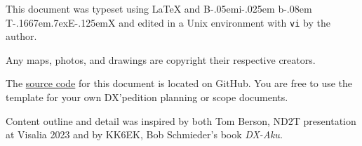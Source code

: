 \documentclass[11pt]{article}
\def\BibTeX{{\rm B\kern-.05em{\sc i\kern-.025em b}\kern-.08em
    T\kern-.1667em\lower.7ex\hbox{E}\kern-.125emX}}
\begin{document}
\par
\begin{colophon}
\begin{flushleft}
This document was typeset using {\LaTeX} and {\BibTeX} and edited
in a Unix environment with {\texttt{vi}} by the author.
\par
Any maps, photos, and drawings are copyright their respective
creators.
\par
The \href{https://github.com/radiojeff/vk9l}{source code} for this
document is located on GitHub.  You are free to use the template
for your own DX'pedition planning or scope documents.
\par
Content outline and detail was inspired by both Tom Berson, ND2T
presentation at Visalia 2023 and by KK6EK,
Bob Schmieder's book {\textit{DX-Aku}}{\cite{refaku}}. 
\end{flushleft}
\end{colophon}
\end{document}
